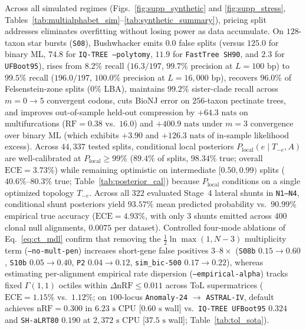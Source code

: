 \documentclass[12pt]{article}
\begin{document}
Across all simulated regimes (Figs.~\ref{fig:supp_synthetic} and \ref{fig:supp_stress}, Tables~\ref{tab:multialphabet_sim}--\ref{tab:synthetic_summary}), pricing split addresses eliminates overfitting without losing power as data accumulate. On $128$-taxon star bursts (\texttt{S08}), Bushwhacker emits $0.0$ false splits (versus $125.0$ for binary ML, $74.8$ for \texttt{IQ-TREE --polytomy}, $11.9$ for \texttt{FastTree SH90}, and $2.3$ for \texttt{UFBoot95}), rises from $8.2\%$ recall ($16.3/197$, $99.7\%$ precision at $L=100\text{ bp}$) to $99.5\%$ recall ($196.0/197$, $100.0\%$ precision at $L=16{,}000\text{ bp}$), recovers $96.0\%$ of Felsenstein-zone splits ($0\%$ LBA), maintains $99.2\%$ sister-clade recall across $m = 0 \to 5$ convergent codons, cuts BioNJ error on $256$-taxon pectinate trees, and improves out-of-sample held-out compression by $+64.3\text{ nats}$ on multifurcations ($\text{RF} = 0.38$ vs.\ $16.0$) and $+400.9\text{ nats}$ under $m=3$ convergence over binary ML (which exhibits $+3.90$ and $+126.3\text{ nats}$ of in-sample likelihood excess). Across $44,337$ tested splits, conditional local posteriors $P_{\text{local}}(e \mid T_{-e}, A)$ are well-calibrated at $P_{\text{local}} \ge 99\%$ ($89.4\%$ of splits, $98.34\%$ true; overall $\text{ECE} = 3.73\%$) while remaining optimistic on intermediate $[0.50, 0.99)$ splits ($40.6\%\text{--}80.3\%$ true; Table~\ref{tab:posterior_cal}) because $P_{\text{local}}$ conditions on a single optimized topology $T_{-e}$. Across all $322$ evaluated Stage~4 lateral shunts in \texttt{N1--N4}, conditional shunt posteriors yield $93.57\%$ mean predicted probability vs.\ $90.99\%$ empirical true accuracy ($\text{ECE} = 4.93\%$, with only $3$ shunts emitted across $400$ clonal null alignments, $0.0075$ per dataset). Controlled four-mode ablations of Eq.~\eqref{eq:ct_mdl} confirm that removing the $\frac{1}{2}\ln\max(1, N-3)$ multiplicity term (\texttt{--no-mult-pen}) increases short-gene false positives $3\text{--}8\times$ (\texttt{S08b} $0.15 \to 0.60$, \texttt{S10b} $0.05 \to 0.40$, \texttt{P2} $0.04 \to 0.12$, \texttt{sim\_bic-500} $0.17 \to 0.22$), whereas estimating per-alignment empirical rate dispersion (\texttt{--empirical-alpha}) tracks fixed $\Gamma(1,1)$ octiles within $\Delta\text{nRF} \le 0.011$ across ToL supermatrices ($\text{ECE} = 1.15\%$ vs.\ $1.12\%$; on $100$-locus \texttt{Anomaly-24} $\to$ \texttt{ASTRAL-IV}, default achieves $\text{nRF} = 0.300$ in $6.23\text{ s}$ CPU [$0.60\text{ s}$ wall] vs.\ \texttt{IQ-TREE UFBoot95} $0.324$ and \texttt{SH-aLRT80} $0.190$ at $2,372\text{ s}$ CPU [$37.5\text{ s}$ wall]; Table~\ref{tab:tol_sota}).
\end{document}

